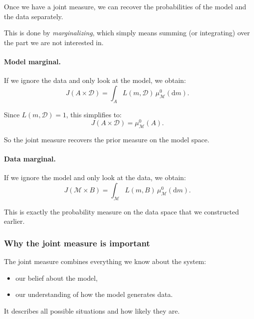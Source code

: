 \documentclass[11pt]{article}
\theoremstyle{remark}
\newcommand{\modelspace}{\mathcal{M}}
\newcommand{\dataspace}{\mathcal{D}}
\begin{document}
Once we have a joint measure, we can recover the probabilities of the model and the data separately.

This is done by \emph{marginalizing}, which simply means summing (or integrating) over the part we are not interested in.

\vspace{2mm}

\paragraph{Model marginal.}

If we ignore the data and only look at the model, we obtain:
\[
J(A \times \dataspace)
=
\int_A L(m,\dataspace)\,\mu_{\modelspace}^0(\mathrm dm).
\]

Since \(L(m,\dataspace)=1\), this simplifies to:
\[
J(A \times \dataspace)
=
\mu_{\modelspace}^0(A).
\]

So the joint measure recovers the prior measure on the model space.

\vspace{2mm}

\paragraph{Data marginal.}

If we ignore the model and only look at the data, we obtain:
\[
J(\modelspace \times B)
=
\int_{\modelspace} L(m,B)\,\mu_{\modelspace}^0(\mathrm dm).
\]

This is exactly the probability measure on the data space that we constructed earlier.

\vspace{2mm}

\subsubsection{Why the joint measure is important}

The joint measure combines everything we know about the system:

\begin{itemize}
    \item our belief about the model,
    \item our understanding of how the model generates data.
\end{itemize}

It describes all possible situations and how likely they are.
\end{document}
